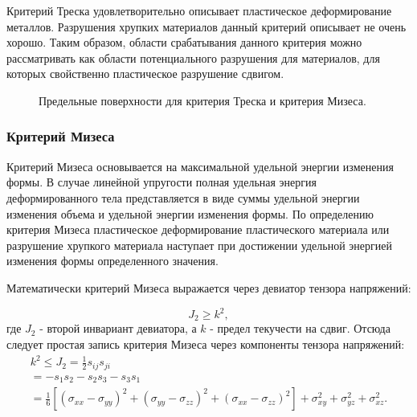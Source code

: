 Критерий Треска удовлетворительно описывает пластическое деформирование металлов. Разрушения хрупких материалов данный критерий описывает не очень хорошо. Таким образом, области срабатывания данного критерия можно рассматривать как области потенциального разрушения для материалов, для которых свойственно пластическое разрушение сдвигом.


\begin{figure}[h]
\caption{Предельные поверхности для критерия Треска и критерия Мизеса.}
\end{figure}


\subsubsection{Критерий Мизеса}

Критерий Мизеса основывается на максимальной удельной энергии изменения формы. В случае линейной упругости полная удельная энергия деформированного тела представляется в виде суммы удельной энергии изменения объема и удельной энергии изменения формы. По определению критерия Мизеса пластическое деформирование пластического материала или разрушение хрупкого материала наступает при достижении удельной энергией изменения формы определенного значения.

Математически критерий Мизеса выражается через девиатор тензора напряжений:

\begin{equation}
\label{von_mises_criteria_generic}
J_2 \ge k^2,
\end{equation}
где $J_2$ - второй инвариант девиатора, а $k$ - предел текучести на сдвиг. Отсюда следует простая запись критерия Мизеса через компоненты тензора напряжений:
\begin{eqnarray}
\label{von_mises_criteria_components}
k^2 \le J_2 = \frac{1}{2}s_{ij}s_{ji} \\
= -s_1s_2 - s_2s_3 - s_3s_1 \\
= \frac{1}{6}[(\sigma_{xx} - \sigma_{yy})^2 + (\sigma_{yy} - \sigma_{zz})^2 + (\sigma_{xx} - \sigma_{zz})^2 ] + \sigma_{xy}^2 + \sigma_{yz}^2 + \sigma_{xz}^2.
\end{eqnarray}

